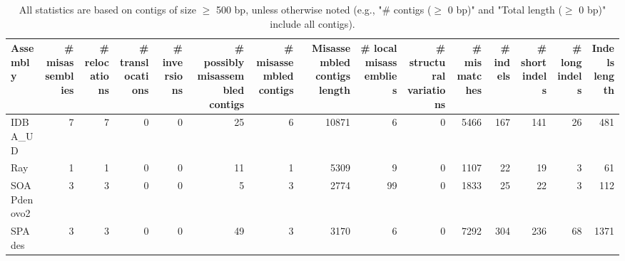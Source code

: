 \documentclass[12pt,a4paper]{article}
\begin{document}
\begin{table}[ht]
\begin{center}
\caption{All statistics are based on contigs of size $\geq$ 500 bp, unless otherwise noted (e.g., "\# contigs ($\geq$ 0 bp)" and "Total length ($\geq$ 0 bp)" include all contigs).}
\begin{tabular}{|l*{14}{|r}|}
\hline
Assembly & \# misassemblies &     \# relocations &     \# translocations &     \# inversions & \# possibly misassembled contigs & \# misassembled contigs & Misassembled contigs length & \# local misassemblies & \# structural variations & \# mismatches & \# indels &     \# short indels &     \# long indels & Indels length \\ \hline
IDBA\_UD & 7 & 7 & 0 & 0 & 25 & 6 & 10871 & 6 & 0 & 5466 & 167 & 141 & 26 & 481 \\ \hline
Ray & 1 & 1 & 0 & 0 & 11 & 1 & 5309 & 9 & 0 & 1107 & 22 & 19 & 3 & 61 \\ \hline
SOAPdenovo2 & 3 & 3 & 0 & 0 & 5 & 3 & 2774 & 99 & 0 & 1833 & 25 & 22 & 3 & 112 \\ \hline
SPAdes & 3 & 3 & 0 & 0 & 49 & 3 & 3170 & 6 & 0 & 7292 & 304 & 236 & 68 & 1371 \\ \hline
\end{tabular}
\end{center}
\end{table}
\end{document}
